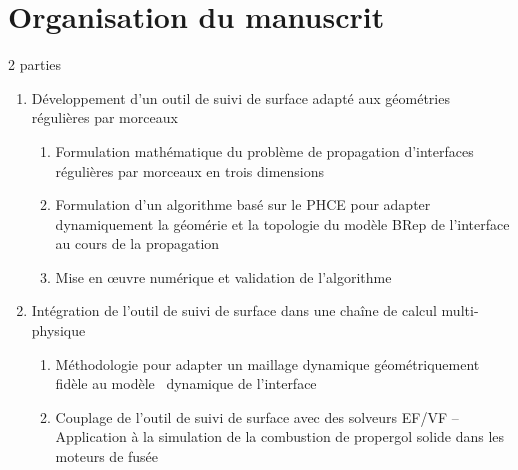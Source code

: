 \section*{Organisation du manuscrit}
2 parties
\begin{enumerate}
	\item Développement d'un outil de suivi de surface adapté aux géométries régulières par morceaux
	\begin{enumerate}
		\item Formulation mathématique du problème de propagation d'interfaces régulières par morceaux en trois dimensions
		\item Formulation d'un algorithme basé sur le PHCE pour adapter dynamiquement la géomérie et la topologie du modèle BRep de l'interface au cours de la propagation
		\item Mise en \oe uvre numérique et validation de l'algorithme
	\end{enumerate}
	
	\item Intégration de l'outil de suivi de surface dans une chaîne de calcul multi-physique
	\begin{enumerate}
		\item Méthodologie pour adapter un maillage dynamique géométriquement fidèle au modèle \brep\ dynamique de l'interface
		\item Couplage de l'outil de suivi de surface avec des solveurs EF/VF -- Application à la simulation de la combustion de propergol solide dans les moteurs de fusée
	\end{enumerate}
\end{enumerate}